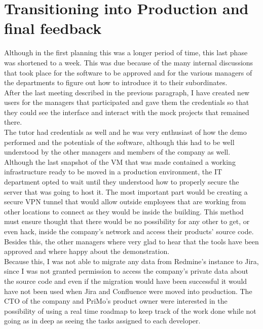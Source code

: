 \section{Transitioning into Production and final feedback}

	Although in the first planning this was a longer period of time, this last phase was shortened to a week.
	This was due because of the many internal discussions that took place for the software to be approved and for the various managers of the departments to figure out how to introduce it to their subordinates.\\
	After the last meeting described in the previous paragraph, I have created new users for the managers that participated and gave them the credentials so that they could see the interface and interact with the mock projects that remained there.\\
	The tutor had credentials as well and he was very enthusiast of how the demo performed and the potentials of the software, although this had to be well understood by the other managers and members of the company as well.\\
	Although the last snapshot of the VM that was made contained a working infrastructure ready to be moved in a production environment, the IT department opted to wait until they understood how to properly secure the server that was going to host it.
	The most important part would be creating a secure VPN tunnel that would allow outside employees that are working from other locations to connect as they would be inside the building.
	This method must ensure thought that there would be no possibility for any other to get, or even hack, inside the company's network and access their products' source code.
	Besides this, the other managers where very glad to hear that the tools have been approved and where happy about the demonstration.\\
	Because this, I was not able to migrate any data from Redmine's instance to Jira, since I was not granted permission to access the company's private data about the source code and even if the migration would have been successful it would have not been used when Jira and Confluence were moved into production.
	The CTO of the company and PriMo's product owner were interested in the possibility of using a real time roadmap to keep track of the work done while not going as in deep as seeing the tasks assigned to each developer.	
	
